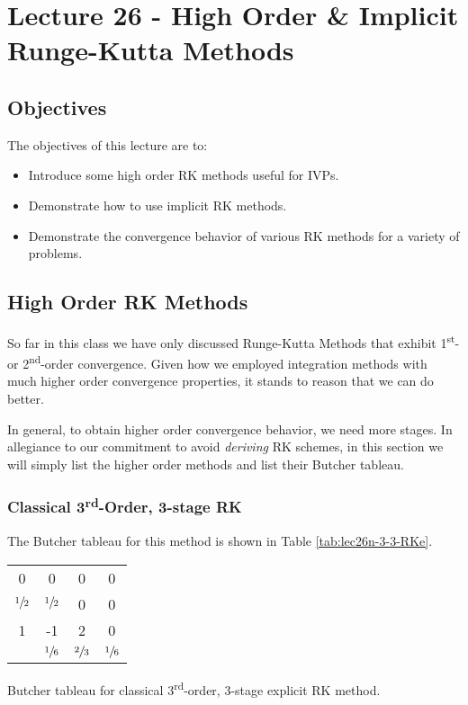 \chapter{Lecture 26 - High Order \& Implicit Runge-Kutta Methods}
\label{ch:lec26n}
\section{Objectives}
The objectives of this lecture are to:
\begin{itemize}
\item Introduce some high order RK methods useful for IVPs.
\item Demonstrate how to use implicit RK methods.
\item Demonstrate the convergence behavior of various RK methods for a variety of problems.
\end{itemize}
\setcounter{lstannotation}{0}

\section{High Order RK Methods}
So far in this class we have only discussed Runge-Kutta Methods that exhibit 1\textsuperscript{st}- or 2\textsuperscript{nd}-order convergence.  Given how we employed integration methods with much higher order convergence properties, it stands to reason that we can do better.

In general, to obtain higher order convergence behavior, we need more stages.  In allegiance to our commitment to avoid \emph{deriving} RK schemes, in this section we will simply list the higher order methods and list their Butcher tableau.

\subsection{Classical 3\textsuperscript{rd}-Order, 3-stage RK}
The Butcher tableau for this method is shown in Table \ref{tab:lec26n-3-3-RKe}.
\begin{margintable}
\begin{tabular}{c|ccc}
0 & 0 & 0 & 0 \\
$\sfrac{1}{2}$ & $\sfrac{1}{2}$ & 0 & 0 \\
1 & -1 & 2 & 0 \\ \hline
  & $\sfrac{1}{6}$ & $\sfrac{2}{3}$ & $\sfrac{1}{6}$ \\
\end{tabular}
\caption{Butcher tableau for classical 3\textsuperscript{rd}-order, 3-stage explicit RK method.}
\label{tab:lec26n-3-3-RKe}
\end{margintable}

